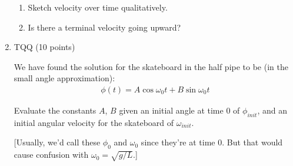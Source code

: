\documentclass[12pt]{article}
\begin{document}
\begin{enumerate}
\begin{enumerate}
        \item Sketch velocity over time qualitatively.


        \item Is there a terminal velocity going upward?


      \end{enumerate}

      \item TQQ (10 points)

      We have found the solution for the skateboard in the half pipe to be (in the small angle approximation):
      \begin{align}
        \phi(t) = A \cos \omega_0 t + B \sin \omega_0 t
      \end{align}

      Evaluate the constants $A$, $B$ given an initial angle at time 0 of $\phi_{init}$, and an initial angular velocity for the skateboard of $\omega_{init}$.

      [Usually, we'd call these $\phi_0$ and $\omega_0$ since they're at time 0. But that would cause confusion with $\omega_0 = \sqrt{g/L}$.]

\end{enumerate}
\end{document}
